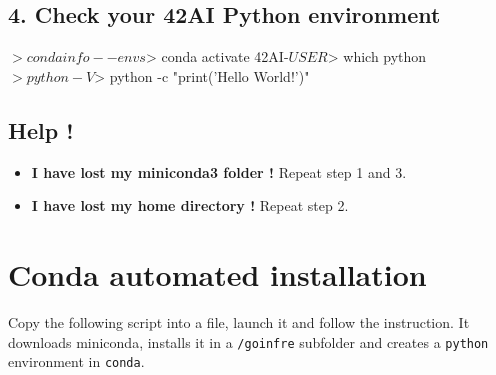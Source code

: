 \documentclass{42-en}
\begin{document}
\subsection*{4. Check your 42AI Python environment}
\begin{42console}
$> conda info --envs
$> conda activate 42AI-$USER
$> which python
$> python -V
$> python -c "print('Hello World!')"
\end{42console}



\subsection*{Help !}
\begin{itemize}
	\item \textbf{I have lost my miniconda3 folder !} Repeat step 1 and 3.
	\item \textbf{I have lost my home directory !} Repeat step 2.
\end{itemize}
\pagebreak



\section*{Conda automated installation}

Copy the following script into a file, launch it and follow the instruction. It downloads miniconda, installs it in a \texttt{/goinfre} subfolder and creates a \texttt{python} environment in \texttt{conda}.
\end{document}
